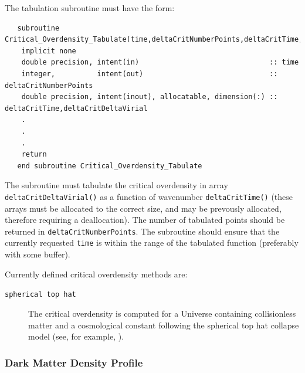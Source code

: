 The tabulation subroutine must have the form:
\begin{verbatim}
   subroutine Critical_Overdensity_Tabulate(time,deltaCritNumberPoints,deltaCritTime,deltaCritDeltaCrit)
    implicit none
    double precision, intent(in)                               :: time
    integer,          intent(out)                              :: deltaCritNumberPoints
    double precision, intent(inout), allocatable, dimension(:) :: deltaCritTime,deltaCritDeltaVirial
    .
    .
    .
    return
   end subroutine Critical_Overdensity_Tabulate
\end{verbatim}
The subroutine must tabulate the critical overdensity in array {\tt deltaCritDeltaVirial()} as a function of wavenumber {\tt deltaCritTime()} (these arrays must be allocated to the correct size, and may be prevously allocated, therefore requiring a deallocation). The number of tabulated points should be returned in {\tt deltaCritNumberPoints}. The subroutine should ensure that the currently requested {\tt time} is within the range of the tabulated function (preferably with some buffer).

Currently defined critical overdensity methods are:
\begin{description}
 \item [{\tt spherical top hat}] The critical overdensity is computed for a Universe containing collisionless matter and a cosmological constant following the spherical top hat collapse model (see, for example, \citealt{percival_cosmological_2005}).
\end{description}

\subsubsection{Dark Matter Density Profile}

